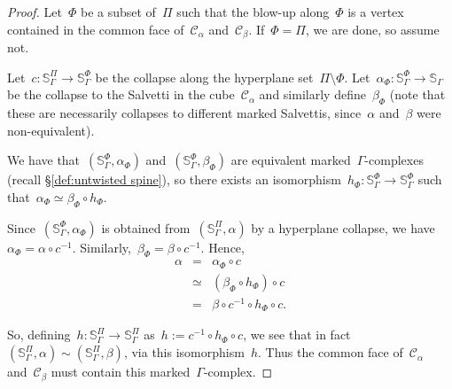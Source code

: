 \documentclass[10pt,a4paper]{amsart}
\newcommand{\sal}{\mathbb{S}_{\Gamma}} %
\newcommand{\salb}[1]{\mathbb{S}_\Gamma^{#1}} %
\begin{document}
\begin{proof}
Let~$\Phi$ be a subset of~$\Pi$ such that the blow-up along~$\Phi$ is a vertex contained in the common face of~$\mathcal{C}_{\alpha}$ and~$\mathcal{C}_{\beta}$. If~$\Phi = \Pi$, we are done, so assume not.

Let~$c : \salb{\Pi} \to \salb{\Phi}$ be the collapse along the hyperplane set~$\Pi \setminus \Phi$. Let~$\alpha_{\Phi} : \salb{\Phi} \to \sal$ be the collapse to the Salvetti in the cube~$\mathcal{C}_{\alpha}$ and similarly define~$\beta_{\Phi}$ (note that these are necessarily collapses to different marked Salvettis, since~$\alpha$ and~$\beta$ were non-equivalent). 

We have that~$(\salb{\Phi}, \alpha_{\Phi})$ and~$(\salb{\Phi}, \beta_{\Phi})$ are equivalent marked~$\Gamma$-complexes (recall \S\ref{def:untwisted spine}), so there exists an isomorphism~$h_{\Phi} : \salb{\Phi} \to \salb{\Phi}$ such that~$\alpha_{\Phi} \simeq \beta_{\Phi} \circ h_{\Phi}$.

Since~$(\salb{\Phi}, \alpha_{\Phi})$ is obtained from~$(\salb{\Pi}, \alpha)$ by a hyperplane collapse, we have~$\alpha_{\Phi} = \alpha \circ c^{-1}$. Similarly,~$\beta_{\Phi} = \beta \circ c^{-1}$. Hence,
\begin{eqnarray*}
    \alpha & = & \alpha_{\Phi} \circ c \\
    & \simeq & (\beta_{\Phi} \circ h_{\Phi}) \circ c \\
    & = & \beta \circ c^{-1} \circ h_{\Phi} \circ c.
\end{eqnarray*}

So, defining~$h:\salb{\Pi} \to \salb{\Pi}$ as~$h := c^{-1} \circ h_{\Phi} \circ c$, we see that in fact~$(\salb{\Pi}, \alpha) \sim (\salb{\Pi}, \beta)$, via this isomorphism~$h$. Thus the common face of~$\mathcal{C}_{\alpha}$ and~$\mathcal{C}_{\beta}$ must contain this marked~$\Gamma$-complex.
\end{proof}
\end{document}
